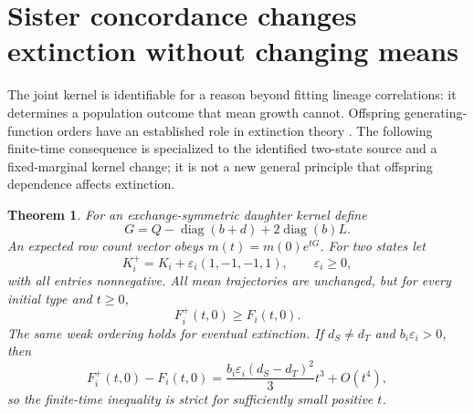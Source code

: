 \documentclass[11pt]{article}
\newtheorem{theorem}{Theorem}[section]
\theoremstyle{definition}
\newcommand{\diag}{\operatorname{diag}}
\begin{document}
\section{Sister concordance changes extinction without changing means}
\label{sec:extinction}
The joint kernel is identifiable for a reason beyond fitting lineage
correlations: it determines a population outcome that mean growth cannot.
Offspring generating-function orders have an established role in extinction
theory \citep{bertacchi2026}. The following finite-time consequence is
specialized to the identified two-state source and a fixed-marginal kernel
change; it is not a new general principle that offspring dependence affects
extinction.

\begin{theorem}\label{thm:extinction}
For an exchange-symmetric daughter kernel define
\begin{equation}\label{eq:G}
 G=Q-\diag(b+d)+2\diag(b)L.
\end{equation}
An expected row count vector obeys $m(t)=m(0)e^{tG}$. For two states let
\begin{equation}\label{eq:Kchange}
 K_i^{+}=K_i+\varepsilon_i(1,-1,-1,1),\qquad\varepsilon_i\ge0,
\end{equation}
with all entries nonnegative. All mean trajectories are unchanged, but for every
initial type and $t\ge0$,
\begin{equation}\label{eq:extorder}
                F_i^{+}(t,0)\ge F_i(t,0).
\end{equation}
The same weak ordering holds for eventual extinction. If $d_S\ne d_T$ and
$b_i\varepsilon_i>0$, then
\begin{equation}\label{eq:strict}
 F_i^{+}(t,0)-F_i(t,0)=\frac{b_i\varepsilon_i(d_S-d_T)^2}{3}t^3+O(t^4),
\end{equation}
so the finite-time inequality is strict for sufficiently small positive $t$.
\end{theorem}
\end{document}
